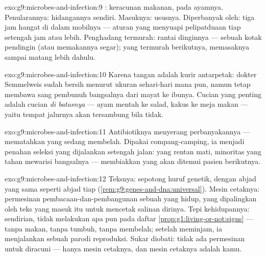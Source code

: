 \begin{solution}{exo:g9:microbes-and-infection:9}
:  keracunan makanan, pada ayamnya.
Penularannya: hidangannya sendiri. Masuknya: ususnya.
Diperbanyak oleh: tiga jam hangat di dalam mobilnya ---
aturan  yang menyuapi pelipatduaan tiap setengah jam
atau lebih. Penghadang termurah: rantai dinginnya --- sebuah
kotak pendingin (atau memakannya segar); yang termurah
berikutnya, memasaknya sampai matang lebih dahulu.
\end{solution}

\begin{solution}{exo:g9:microbes-and-infection:10}
Karena tangan adalah kurir antarpetak: dokter Semmelweis
sudah bersih menurut ukuran sehari-hari mana pun, namun tetap
membawa sang pembunuh bangsalnya dari mayat ke ibunya.
Cucian yang penting adalah cucian \emph{di batasnya} ---
ayam mentah ke salad, kakus ke meja makan --- yaitu tempat
jalurnya akan tersambung bila tidak.
\end{solution}

\begin{solution}{exo:g9:microbes-and-infection:11}
Antibiotiknya menyerang perbanyakannya --- mematahkan
 yang sedang membelah. Dipakai compang-camping, ia
menjadi penahan seleksi yang dijalankan setengah jalan: yang
rentan mati, minoritas yang tahan mewarisi bangsalnya ---
membiakkan  yang akan ditemui pasien berikutnya.
\end{solution}

\begin{solution}{exo:g9:microbes-and-infection:12}
Teksnya: sepotong huruf genetik, dengan abjad yang sama
seperti abjad tiap 
(\cref{rem:g9:genes-and-dna:universal}). Mesin cetaknya:
permesinan pembacaan-dan-pembangunan sebuah  yang hidup,
yang dipalingkan oleh teks yang masuk itu untuk mencetak
salinan dirinya. Tepi kehidupannya: sendirian, 
tidak melakukan apa pun pada daftar
\cref{prop:g1:living-or-not:signs} --- tanpa makan, tanpa
tumbuh, tanpa membelah; setelah meminjam, ia menjalankan
sebuah parodi reproduksi. Sukar diobati: tidak ada permesinan
 untuk diracuni --- hanya mesin cetaknya, dan mesin
cetaknya adalah kamu.
\end{solution}


